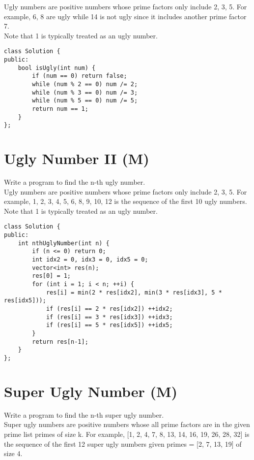 Ugly numbers are positive numbers whose prime factors only include 2, 3, 5. For example, 6, 8 are ugly while 14 is not ugly since it includes another prime factor 7.\\

Note that 1 is typically treated as an ugly number. \\

\begin{lstlisting}
class Solution {
public:
    bool isUgly(int num) {
        if (num == 0) return false;
        while (num % 2 == 0) num /= 2;
        while (num % 3 == 0) num /= 3;
        while (num % 5 == 0) num /= 5;
        return num == 1;
    }
};
\end{lstlisting}


\section{Ugly Number II (M)}
Write a program to find the n-th ugly number. \\

Ugly numbers are positive numbers whose prime factors only include 2, 3, 5. For example, 1, 2, 3, 4, 5, 6, 8, 9, 10, 12 is the sequence of the first 10 ugly numbers. \\

Note that 1 is typically treated as an ugly number. \\

\begin{lstlisting}
class Solution {
public:
    int nthUglyNumber(int n) {
        if (n <= 0) return 0;
        int idx2 = 0, idx3 = 0, idx5 = 0;
        vector<int> res(n);
        res[0] = 1;
        for (int i = 1; i < n; ++i) {
            res[i] = min(2 * res[idx2], min(3 * res[idx3], 5 * res[idx5]));
            if (res[i] == 2 * res[idx2]) ++idx2;
            if (res[i] == 3 * res[idx3]) ++idx3;
            if (res[i] == 5 * res[idx5]) ++idx5;
        }
        return res[n-1];
    }
};
\end{lstlisting}


\section{Super Ugly Number (M)}
Write a program to find the n-th super ugly number.\\

Super ugly numbers are positive numbers whose all prime factors are in the given prime list primes of size k. For example, [1, 2, 4, 7, 8, 13, 14, 16, 19, 26, 28, 32] is the sequence of the first 12 super ugly numbers given primes = [2, 7, 13, 19] of size 4.\\

